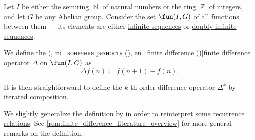 \begin{definition}\label{def:finite_difference_operator}\mimprovised
  Let \( I \) be either the \hyperref[def:natural_numbers]{semiring \( \BbbN \) of natural numbers} or the \hyperref[def:integers]{ring \( \BbbZ \) of integers}, and let \( G \) be any \hyperref[def:abelian_group]{Abelian group}. Consider the set \( \fun(I, G) \) of all functions between them --- its elements are either \hyperref[def:sequence]{infinite sequences} or \hyperref[def:doubly_infinite_sequence]{doubly infinite sequences}.

  We define the \term[bg=крайна разлика от ред \( k \) (\cite[21]{Боянов2008ЧислениМетоди}), ru=конечная разность (\cite[11]{Гельфонд1959ИсчислениеКонечныхРазностей}), en=finite difference (\cite[77]{Stanley2012EnumerativeCombinatoricsVol1})]{finite difference} operator \( \Delta \) on \( \fun(I, G) \) as
  \begin{equation}\label{eq:def:finite_difference_operator}
    \Delta f(n) \coloneqq f(n + 1) - f(n).
  \end{equation}

  It is then straightforward to define the \( k \)-th order difference operator \( \Delta^k \) by iterated composition.
\end{definition}
\begin{comments}
  \item We slightly generalize the definition by \textcite[77]{Stanley2012EnumerativeCombinatoricsVol1} in order to reinterpret some \hyperref[def:recurrence_relation]{recurrence relations}. See \cref{rem:finite_difference_literature_overview} for more general remarks on the definition.
\end{comments}

